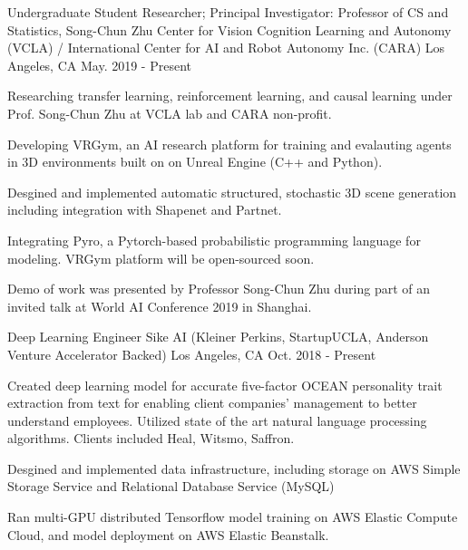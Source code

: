 

\begin{cventries}

  \cventry
    {Undergraduate Student Researcher; Principal Investigator: Professor of CS and Statistics, Song-Chun Zhu} %
    {Center for Vision Cognition Learning and Autonomy (VCLA) / \newline
    International Center for AI and Robot Autonomy Inc. (CARA)} %
    {Los Angeles, CA} %
    {May. 2019 - Present} %
    {
      \begin{cvitems} %
        \item {Researching transfer learning, reinforcement learning, and causal learning under Prof. Song-Chun Zhu at VCLA lab and CARA non-profit.}
        \item {Developing VRGym, an AI research platform for training and evalauting agents in
        3D environments built on on Unreal Engine (C++ and Python). } 
        \item {Desgined and implemented automatic structured, stochastic 3D scene generation including integration with Shapenet and Partnet.}
        \item {Integrating Pyro, a Pytorch-based probabilistic programming language for modeling. VRGym platform will be open-sourced soon.}
        \item {Demo of work was presented by Professor Song-Chun Zhu during part of an invited talk at World AI Conference 2019 in Shanghai.}
      \end{cvitems}
    }

  \cventry
    {Deep Learning Engineer} %
    {Sike AI (Kleiner Perkins, StartupUCLA, Anderson Venture Accelerator Backed)} %
    {Los Angeles, CA} %
    {Oct. 2018 - Present} %
    {
      \begin{cvitems} %
        \item {Created deep learning model for accurate five-factor OCEAN personality trait extraction from text for enabling 
        client companies' management to better understand employees. Utilized state of the art 
        natural language processing algorithms. Clients included Heal, Witsmo, Saffron.}
        \item {Desgined and implemented data infrastructure, including storage on AWS Simple Storage Service
         and Relational Database Service (MySQL)
        \item Ran multi-GPU distributed Tensorflow model training on AWS Elastic Compute Cloud, and model deployment on AWS Elastic Beanstalk.}
      \end{cvitems}
    }


\end{cventries}
